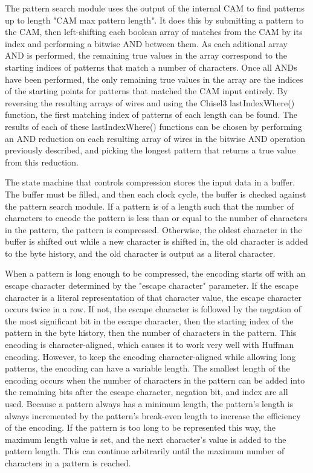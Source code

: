 \documentclass[doublespace,nopageskip]{VTthesis}
\begin{document}
The pattern search module uses the output of the internal CAM to find patterns up to length "CAM max pattern length". It does this by submitting a pattern to the CAM, then left-shifting each boolean array of matches from the CAM by its index and performing a bitwise AND between them. As each aditional array AND is performed, the remaining true values in the array correspond to the starting indices of patterns that match a number of characters. Once all ANDs have been performed, the only remaining true values in the array are the indices of the starting points for patterns that matched the CAM input entirely. By reversing the resulting arrays of wires and using the Chisel3 lastIndexWhere() function, the first matching index of patterns of each length can be found. The results of each of these lastIndexWhere() functions can be chosen by performing an AND reduction on each resulting array of wires in the bitwise AND operation previously described, and picking the longest pattern that returns a true value from this reduction.

The state machine that controls compression stores the input data in a buffer. The buffer must be filled, and then each clock cycle, the buffer is checked against the pattern search module. If a pattern is of a length such that the number of characters to encode the pattern is less than or equal to the number of characters in the pattern, the pattern is compressed. Otherwise, the oldest character in the buffer is shifted out while a new character is shifted in, the old character is added to the byte history, and the old character is output as a literal character.

When a pattern is long enough to be compressed, the encoding starts off with an escape character determined by the "escape character" parameter. If the escape character is a literal representation of that character value, the escape character occurs twice in a row. If not, the escape character is followed by the negation of the most significant bit in the escape character, then the starting index of the pattern in the byte history, then the number of characters in the pattern. This encoding is character-aligned, which causes it to work very well with Huffman encoding. However, to keep the encoding character-aligned while allowing long patterns, the encoding can have a variable length. The smallest length of the encoding occurs when the number of characters in the pattern can be added into the remaining bits after the escape character, negation bit, and index are all used. Because a pattern always has a minimum length, the pattern's length is always incremented by the pattern's break-even length to increase the efficiency of the encoding. If the pattern is too long to be represented this way, the maximum length value is set, and the next character's value is added to the pattern length. This can continue arbitrarily until the maximum number of characters in a pattern is reached. 
\end{document}
